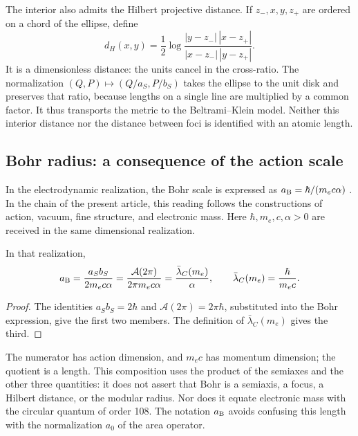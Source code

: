 The interior also admits the Hilbert projective distance. If
\(z_-,x,y,z_+\) are ordered on a chord of the ellipse, define
\[
 d_H(x,y)=\frac12\log
 \frac{|y-z_-|\,|x-z_+|}{|x-z_-|\,|y-z_+|}.
\]
It is a dimensionless distance: the units cancel in the cross-ratio.
The normalization \((Q,P)\mapsto(Q/a_S,P/b_S)\) takes the ellipse
to the unit disk and preserves that ratio, because lengths on a
single line are multiplied by a common factor. It thus transports the metric
to the Beltrami--Klein model. Neither this interior distance nor the distance
between foci is identified with an atomic length.

\subsection{Bohr radius: a consequence of the action scale}
\label{sec:ii-elipse-bohr}

In the electrodynamic realization, the Bohr scale is expressed as
\(a_{\rm B}=\hbar/(m_ec\alpha)\) \cite{codata2022}. In the chain
of the present article, this reading follows the constructions of
action, vacuum, fine structure, and electronic mass. Here
\(\hbar,m_e,c,\alpha>0\) are received in the same dimensional realization.
\begin{proposition}
\label{prop:ii-elipse-bohr}
In that realization,
\begin{equation}
 a_{\rm B}=\frac{a_Sb_S}{2m_ec\alpha}
 =\frac{\mathcal A(2\pi)}{2\pi m_ec\alpha}
 =\frac{\bar\lambda_C(m_e)}{\alpha},\qquad
 \bar\lambda_C(m_e)=\frac{\hbar}{m_ec}.
 \label{eq:ii-elipse-bohr}
\end{equation}
\end{proposition}
\begin{proof}
The identities \(a_Sb_S=2\hbar\) and
\(\mathcal A(2\pi)=2\pi\hbar\), substituted into the Bohr
expression, give the first two members. The definition of
\(\bar\lambda_C(m_e)\) gives the third.
\end{proof}

The numerator has action dimension, and \(m_ec\) has momentum dimension;
the quotient is a length. This composition uses the product of
the semiaxes and the other three quantities: it does not assert that Bohr is a semiaxis,
a focus, a Hilbert distance, or the modular radius. Nor does it equate
electronic mass with the circular quantum of order 108. The notation
\(a_{\rm B}\) avoids confusing this length with the normalization
\(a_0\) of the area operator.


